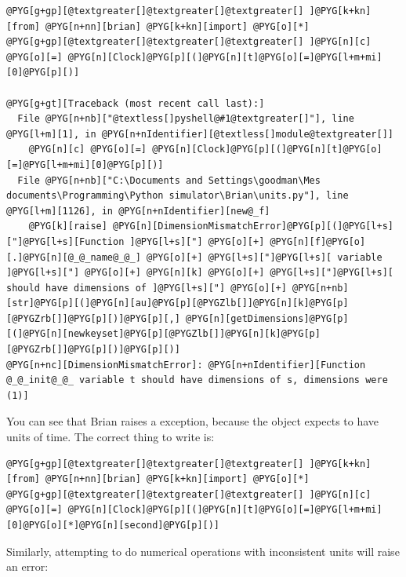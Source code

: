 \documentclass[letterpaper,10pt,english]{manual}
\begin{document}
\begin{Verbatim}[commandchars=@\[\]]
@PYG[g+gp][@textgreater[]@textgreater[]@textgreater[] ]@PYG[k+kn][from] @PYG[n+nn][brian] @PYG[k+kn][import] @PYG[o][*]
@PYG[g+gp][@textgreater[]@textgreater[]@textgreater[] ]@PYG[n][c] @PYG[o][=] @PYG[n][Clock]@PYG[p][(]@PYG[n][t]@PYG[o][=]@PYG[l+m+mi][0]@PYG[p][)]

@PYG[g+gt][Traceback (most recent call last):]
  File @PYG[n+nb]["@textless[]pyshell@#1@textgreater[]"], line @PYG[l+m][1], in @PYG[n+nIdentifier][@textless[]module@textgreater[]]
    @PYG[n][c] @PYG[o][=] @PYG[n][Clock]@PYG[p][(]@PYG[n][t]@PYG[o][=]@PYG[l+m+mi][0]@PYG[p][)]
  File @PYG[n+nb]["C:\Documents and Settings\goodman\Mes documents\Programming\Python simulator\Brian\units.py"], line @PYG[l+m][1126], in @PYG[n+nIdentifier][new@_f]
    @PYG[k][raise] @PYG[n][DimensionMismatchError]@PYG[p][(]@PYG[l+s]["]@PYG[l+s][Function ]@PYG[l+s]["] @PYG[o][+] @PYG[n][f]@PYG[o][.]@PYG[n][@_@_name@_@_] @PYG[o][+] @PYG[l+s]["]@PYG[l+s][ variable ]@PYG[l+s]["] @PYG[o][+] @PYG[n][k] @PYG[o][+] @PYG[l+s]["]@PYG[l+s][ should have dimensions of ]@PYG[l+s]["] @PYG[o][+] @PYG[n+nb][str]@PYG[p][(]@PYG[n][au]@PYG[p][@PYGZlb[]]@PYG[n][k]@PYG[p][@PYGZrb[]]@PYG[p][)]@PYG[p][,] @PYG[n][getDimensions]@PYG[p][(]@PYG[n][newkeyset]@PYG[p][@PYGZlb[]]@PYG[n][k]@PYG[p][@PYGZrb[]]@PYG[p][)]@PYG[p][)]
@PYG[n+nc][DimensionMismatchError]: @PYG[n+nIdentifier][Function @_@_init@_@_ variable t should have dimensions of s, dimensions were (1)]
\end{Verbatim}

You can see that Brian raises a  exception, because the
\hyperlink{brian.Clock}{} object expects  to have units of time. The correct thing to write is:

\begin{Verbatim}[commandchars=@\[\]]
@PYG[g+gp][@textgreater[]@textgreater[]@textgreater[] ]@PYG[k+kn][from] @PYG[n+nn][brian] @PYG[k+kn][import] @PYG[o][*]
@PYG[g+gp][@textgreater[]@textgreater[]@textgreater[] ]@PYG[n][c] @PYG[o][=] @PYG[n][Clock]@PYG[p][(]@PYG[n][t]@PYG[o][=]@PYG[l+m+mi][0]@PYG[o][*]@PYG[n][second]@PYG[p][)]
\end{Verbatim}

Similarly, attempting to do numerical operations with inconsistent units will
raise an error:
\end{document}
